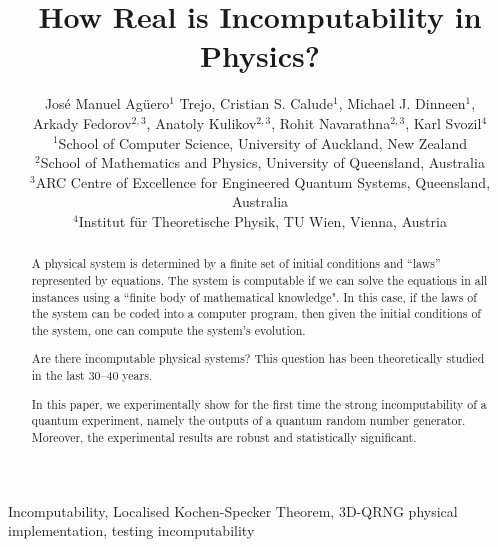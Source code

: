 \documentclass[l1pt]{elsarticle}
\begin{document}
\begin{frontmatter}
\title{How Real is Incomputability in Physics?}

\author{Jos\'{e} Manuel Ag\"{u}ero$^{1}$
	 Trejo, Cristian S. Calude$^{1}$,
	 Michael J. Dinneen$^{1}$,\\
	 Arkady Fedorov$^{2,3}$, Anatoly Kulikov$^{2,3}$, Rohit Navarathna$^{2,3}$, Karl Svozil$^{4}$\\[3ex]$^{1}$School of Computer Science, University of Auckland, New Zealand\\
	 $^{2}$School of Mathematics and Physics, University of Queensland, Australia\\
	 $^{3}$ARC Centre of Excellence for Engineered Quantum Systems, Queensland, Australia\\
	 $^{4}$Institut f\"{u}r Theoretische Physik, TU Wien, Vienna, Austria}
\begin{abstract}
    A physical system is determined by a finite set of initial conditions and ``laws'' represented by equations. The system is computable if we can solve the equations in all instances using a ``finite body of mathematical knowledge". In this case, if the laws of the system can be coded into a computer program, then given the initial conditions of the system, one can compute the system's evolution.


Are there incomputable physical systems? This question has been theoretically studied in the last 30--40 years.

 {\color{black} In this paper, we experimentally show for the first time
the strong incomputability of a quantum experiment, namely the outputs of a quantum random number generator. Moreover, the experimental results are robust and statistically significant.
}


%
%
%
%
\end{abstract}
\begin{keyword}
	Incomputability, Localised Kochen-Specker Theorem, 3D-QRNG physical implementation, testing incomputability
\end{keyword}

\end{frontmatter}
\end{document}
